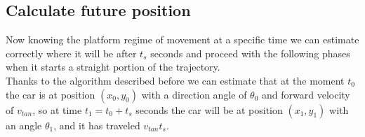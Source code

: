 \newpage

\subsection{Calculate future position}
Now knowing the platform regime of movement at a specific time we can estimate correctly where it will be after $t_s$ seconds and proceed with the following phases when it starts a straight portion of the trajectory.\\
Thanks to the algorithm described before we can estimate that at the moment $t_0$ the car is at position $(x_0,y_0)$ with a direction angle of $\theta_0$ and forward velocity of $v_{tan}$, so at time $t_1 = t_0 + t_s$ seconds the car will be at position $(x_1,y_1)$ with an angle  $\theta_1$, and it has traveled  $v_{tan}t_s$.

